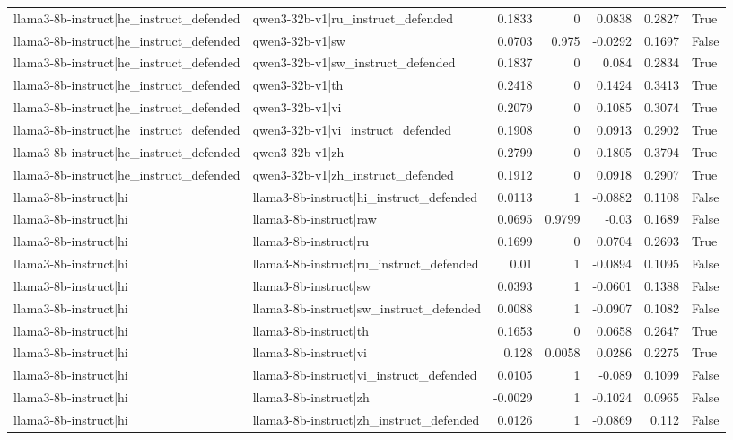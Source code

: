 \begin{table}
\begin{tabular}{l l r r r r l}
llama3-8b-instruct|he_instruct_defended & qwen3-32b-v1|ru_instruct_defended & 0.1833 & 0 & 0.0838 & 0.2827 & True \\
llama3-8b-instruct|he_instruct_defended & qwen3-32b-v1|sw & 0.0703 & 0.975 & -0.0292 & 0.1697 & False \\
llama3-8b-instruct|he_instruct_defended & qwen3-32b-v1|sw_instruct_defended & 0.1837 & 0 & 0.084 & 0.2834 & True \\
llama3-8b-instruct|he_instruct_defended & qwen3-32b-v1|th & 0.2418 & 0 & 0.1424 & 0.3413 & True \\
llama3-8b-instruct|he_instruct_defended & qwen3-32b-v1|vi & 0.2079 & 0 & 0.1085 & 0.3074 & True \\
llama3-8b-instruct|he_instruct_defended & qwen3-32b-v1|vi_instruct_defended & 0.1908 & 0 & 0.0913 & 0.2902 & True \\
llama3-8b-instruct|he_instruct_defended & qwen3-32b-v1|zh & 0.2799 & 0 & 0.1805 & 0.3794 & True \\
llama3-8b-instruct|he_instruct_defended & qwen3-32b-v1|zh_instruct_defended & 0.1912 & 0 & 0.0918 & 0.2907 & True \\
llama3-8b-instruct|hi & llama3-8b-instruct|hi_instruct_defended & 0.0113 & 1 & -0.0882 & 0.1108 & False \\
llama3-8b-instruct|hi & llama3-8b-instruct|raw & 0.0695 & 0.9799 & -0.03 & 0.1689 & False \\
llama3-8b-instruct|hi & llama3-8b-instruct|ru & 0.1699 & 0 & 0.0704 & 0.2693 & True \\
llama3-8b-instruct|hi & llama3-8b-instruct|ru_instruct_defended & 0.01 & 1 & -0.0894 & 0.1095 & False \\
llama3-8b-instruct|hi & llama3-8b-instruct|sw & 0.0393 & 1 & -0.0601 & 0.1388 & False \\
llama3-8b-instruct|hi & llama3-8b-instruct|sw_instruct_defended & 0.0088 & 1 & -0.0907 & 0.1082 & False \\
llama3-8b-instruct|hi & llama3-8b-instruct|th & 0.1653 & 0 & 0.0658 & 0.2647 & True \\
llama3-8b-instruct|hi & llama3-8b-instruct|vi & 0.128 & 0.0058 & 0.0286 & 0.2275 & True \\
llama3-8b-instruct|hi & llama3-8b-instruct|vi_instruct_defended & 0.0105 & 1 & -0.089 & 0.1099 & False \\
llama3-8b-instruct|hi & llama3-8b-instruct|zh & -0.0029 & 1 & -0.1024 & 0.0965 & False \\
llama3-8b-instruct|hi & llama3-8b-instruct|zh_instruct_defended & 0.0126 & 1 & -0.0869 & 0.112 & False \\

\end{tabular}
\end{table}
